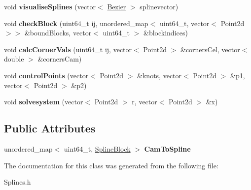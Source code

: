 \begin{DoxyCompactItemize}
\mbox{\label{class_splines_a27da4566d062aef63784e366131cdbbc}} 
void {\bfseries visualise\+Splines} (vector$<$ \mbox{\hyperlink{class_bezier}{Bezier}} $>$ splinevector)
\item 
\mbox{\label{class_splines_a936fa0d6db7784d51f29a7394c65cbad}} 
void {\bfseries check\+Block} (uint64\+\_\+t ij, unordered\+\_\+map$<$ uint64\+\_\+t, vector$<$ Point2d $>$$>$ \&bound\+Blocks, vector$<$ uint64\+\_\+t $>$ \&blockindices)
\item 
\mbox{\label{class_splines_a0b057f198d2ecfb8fbe0f354dbb87890}} 
void {\bfseries calc\+Corner\+Vals} (uint64\+\_\+t ij, vector$<$ Point2d $>$ \&corners\+Cel, vector$<$ double $>$ \&corners\+Cam)
\item 
\mbox{\label{class_splines_ac924e92b9e4a6b1f8b7174a048e8f1ef}} 
void {\bfseries control\+Points} (vector$<$ Point2d $>$ \&knots, vector$<$ Point2d $>$ \&p1, vector$<$ Point2d $>$ \&p2)
\item 
\mbox{\label{class_splines_a7deb2e3418b72e4a1d47085603b45e65}} 
void {\bfseries solvesystem} (vector$<$ Point2d $>$ r, vector$<$ Point2d $>$ \&x)
\end{DoxyCompactItemize}
\subsection*{Public Attributes}
\begin{DoxyCompactItemize}
\item 
\mbox{\label{class_splines_a3d26264803ed3945cc173270054aee12}} 
unordered\+\_\+map$<$ uint64\+\_\+t, \mbox{\hyperlink{class_spline_block}{Spline\+Block}} $>$ {\bfseries Cam\+To\+Spline}
\end{DoxyCompactItemize}


The documentation for this class was generated from the following file\+:\begin{DoxyCompactItemize}
\item 
Splines.\+h\end{DoxyCompactItemize}
